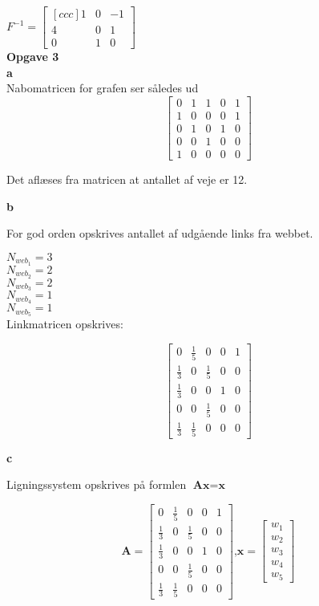 \documentclass[12pt,a4paper]{article}
\begin{document}
$F^{-1} = \begin{bmatrix}[ccc]
1 & 0 & -1\\
4 & 0 & 1\\
0 & 1 & 0
\end{bmatrix}  $\\

\textbf{Opgave 3} \\

\textbf{a}\\

Nabomatricen for grafen ser således ud
\[
\begin{bmatrix}
0 & 1 & 1 & 0 & 1\\
1 & 0 & 0 & 0 & 1 \\
0 & 1 & 0 & 1 & 0 \\
0 & 0 & 1 & 0 & 0 \\
1 & 0 & 0 & 0 & 0
\end{bmatrix}
\]

Det aflæses fra matricen at antallet af veje er 12.

\textbf{b}

For god orden opskrives antallet af udgående links fra webbet.

$N_{web_1} = 3$\\
$N_{web_2} = 2$\\
$N_{web_3} = 2$\\
$N_{web_4} = 1$\\
$N_{web_5} = 1$\\

Linkmatricen opskrives:

\[
\begin{bmatrix}
0 & \frac{1}{5} & 0 & 0 & 1 \\
\frac{1}{3} & 0 & \frac{1}{5} & 0 & 0\\
\frac{1}{3} & 0 & 0 & 1 & 0  \\
0 & 0 & \frac{1}{5} & 0 & 0 \\
\frac{1}{3} & \frac{1}{5} & 0 & 0 & 0  
\end{bmatrix}
\]

\textbf{c}

Ligningssystem opskrives på formlen $\textbf{Ax} = \textbf{x}$

\[
\textbf{A} = \begin{bmatrix}
0 & \frac{1}{5} & 0 & 0 & 1 \\
\frac{1}{3} & 0 & \frac{1}{5} & 0 & 0\\
\frac{1}{3} & 0 & 0 & 1 & 0  \\
0 & 0 & \frac{1}{5} & 0 & 0 \\
\frac{1}{3} & \frac{1}{5} & 0 & 0 & 0  
\end{bmatrix} \text{,} \textbf{x} = 
\begin{bmatrix}
w_1\\w_2\\w_3\\w_4\\w_5
\end{bmatrix}
\]
\end{document}
